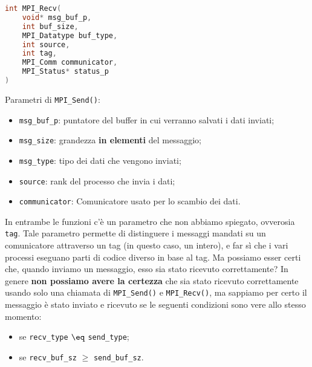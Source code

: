 \begin{codedefine}
    \begin{lstlisting}[language = C, numbers = none]
int MPI_Recv(
    void* msg_buf_p,
    int buf_size,
    MPI_Datatype buf_type,
    int source,
    int tag,
    MPI_Comm communicator,
    MPI_Status* status_p
)\end{lstlisting}
    \manlower    
    Parametri di \verb|MPI_Send()|:
    \begin{itemize}
        \item \verb|msg_buf_p|: puntatore del buffer in cui verranno salvati i dati inviati;
        \item \verb|msg_size|: grandezza \textbf{in elementi} del messaggio;
        \item \verb|msg_type|: tipo dei dati che vengono inviati;
        \item \verb|source|: rank del processo che invia i dati;
        \item \verb|communicator|: Comunicatore usato per lo scambio dei dati.
    \end{itemize}
\end{codedefine}

In entrambe le funzioni c'è un parametro che non abbiamo spiegato, ovverosia \verb|tag|. Tale parametro permette di distinguere i messaggi mandati su un comunicatore attraverso un tag (in questo caso, un intero), e far sì che i vari processi eseguano parti di codice diverso in base al tag.
\nwl
Ma possiamo esser certi che, quando inviamo un messaggio, esso sia stato ricevuto correttamente? In genere \textbf{non possiamo avere la certezza} che sia stato ricevuto correttamente usando solo una chiamata di \verb|MPI_Send()| e \verb|MPI_Recv()|, ma sappiamo per certo il messaggio è stato inviato e ricevuto se le seguenti condizioni sono vere allo stesso momento:
\begin{itemize}
    \item se \verb|recv_type| $\eq$ \verb|send_type|;
    \item se \verb|recv_buf_sz| $\geq$ \verb|send_buf_sz|.
\end{itemize}

